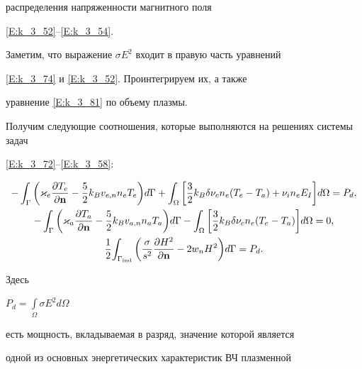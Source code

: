 распределения напряженности магнитного поля


\eqref{E:k_3_52}--\eqref{E:k_3_54}.








Заметим, что выражение $\sigma E^2$ входит в правую часть уравнений 


\eqref{E:k_3_74} и \eqref{E:k_3_52}. Проинтегрируем их, а также 


уравнение \eqref{E:k_3_81} по объему плазмы.


Получим следующие соотношения, которые выполняются на решениях системы задач


\eqref{E:k_3_72}--\eqref{E:k_3_58}:


\begin{gather}


- \int_\Gamma {\bigg({\varkappa_e \frac{{\partial T_e}}{{\partial \bold{n}}}-


\frac{5} {2}k_B v_{e,n} n_e T_e}\bigg)d\Gamma}+\int_\Omega 


\bigg[{\frac{3} {2}k_B\delta \nu_c n_e({T_e - T_a})+\nu_i n_e E_I}\bigg] 


d\Omega=P_d,\label{E:k_3_94b}\\


%


-\int_\Gamma {\bigg({\varkappa_a \frac{{\partial T_a}}{{\partial\bold{n}}}-


\frac{5} {2}k_B v_{a,n} n_a T_a}\bigg)d\Gamma}-\int_\Omega 


\bigg[{\frac{3} {2}k_B\delta \nu_c n_e({T_e - T_a})}


\bigg]d\Omega=0,\label{E:k_3_94c} \\


%


\frac{1} {2}{\int_{\Gamma_{\ind}} {\bigg(


\frac{\sigma}{s^2}{\frac{\partial H^{2}}{\partial \bold{n}} -


2w_n H^{2}}\bigg)}d\Gamma}=P_d.\label{E:k_3_94a}


\end{gather}


Здесь




$P_d=\int\limits_\Omega {\sigma E^2 d\Omega}$


есть мощность, вкладываемая в разряд, значение которой является


одной из основных энергетических характеристик ВЧ плазменной


